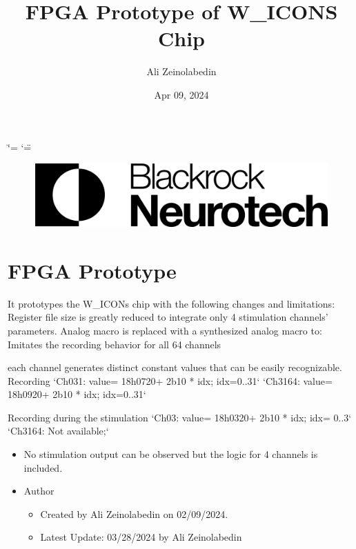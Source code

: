 \documentclass[letterpaper,10pt,english]{sphinxmanual}
\title{FPGA Prototype of W\_ICONS Chip}
\date{Apr 09, 2024}
\author{Ali Zeinolabedin}
\begin{document}
\ifdefined\shorthandoff
  \ifnum\catcode`\=\string=\active\shorthandoff{=}\fi
  \ifnum\catcode`\"=\active{}\fi
\fi

\begin{titlepage}
\begin{figure}[h]
\centering
\includegraphics[scale=0.8]{../../source/logo.png}
\end{figure}
\sphinxmaketitle

\sphinxtableofcontents

\pagestyle{normal}
\label{\detokenize{index::doc}}


\end{titlepage}

\sphinxstepscope


\chapter{FPGA Prototype}
\label{\detokenize{fpga_prototype:fpga-prototype}}\label{\detokenize{fpga_prototype::doc}}
\sphinxAtStartPar
It prototypes the W\_ICONs chip with the following changes and limitations:
\sphinxhyphen{} Register file size is greatly reduced to integrate only 4 stimulation channels’ parameters.
\sphinxhyphen{} Analog macro is replaced with a synthesized analog macro to:
\sphinxhyphen{} Imitates the recording behavior for all 64 channels

\begin{sphinxVerbatim}[commandchars=\\\{\}]
\PYGZhy{} each channel generates distinct constant values that can be easily recognizable.
  \PYGZhy{} Recording
    \PYGZhy{} `Ch0\PYGZti{}31:    value= 18\PYGZsq{}h0720+ 2\PYGZsq{}b10 * idx; idx=0..31`
    \PYGZhy{} `Ch31\PYGZti{}64:   value= 18\PYGZsq{}h0920+ 2\PYGZsq{}b10 * idx; idx=0..31`

  \PYGZhy{} Recording during the stimulation
    \PYGZhy{} `Ch0\PYGZti{}3:     value= 18\PYGZsq{}h0320+ 2\PYGZsq{}b10 * idx; idx= 0..3`
    \PYGZhy{} `Ch31\PYGZti{}64:   Not available;` 
\end{sphinxVerbatim}
\begin{itemize}
\item {} 
\sphinxAtStartPar
No stimulation output can be observed but the logic for 4 channels is included.

\item {} 
\sphinxAtStartPar
Author
\begin{itemize}
\item {} 
\sphinxAtStartPar
Created by Ali Zeinolabedin on 02/09/2024.

\item {} 
\sphinxAtStartPar
Latest Update: 03/28/2024 by Ali Zeinolabedin

\end{itemize}

\end{itemize}
\end{document}

